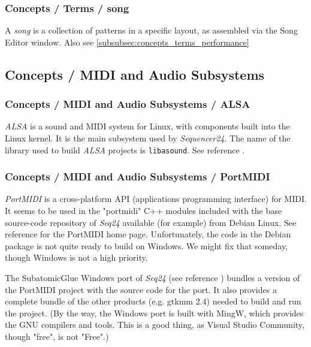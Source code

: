\subsubsection{Concepts / Terms / song}
\label{subsubsec:concepts_terms_song}

   A \textsl{song} is a collection of patterns in a specific layout, as
   assembled via the Song Editor window.
   Also see \ref{subsubsec:concepts_terms_performance}

\subsection{Concepts / MIDI and Audio Subsystems}
\label{subsec:concepts_midi_audio_subsystems}

\subsubsection{Concepts / MIDI and Audio Subsystems / ALSA}
\label{subsubsec:concepts_midi_audio_alsa}

   \textsl{ALSA} is a sound and MIDI system for Linux, with components built
   into the Linux kernel. It is the main subsystem used by
   \textsl{Sequencer24}.  The name of the library used to build
   \textsl{ALSA} projects is \texttt{libasound}.
   See reference \cite{alsa}.

\subsubsection{Concepts / MIDI and Audio Subsystems / PortMIDI}
\label{subsubsec:concepts_midi_audio_portmidi}

   \textsl{PortMIDI} is a cross-platform API (applications programming
   interface) for MIDI.  It seems to be used in the "portmidi" C++ modules
   included with the base source-code repository of \textsl{Seq24} available
   (for example) from Debian Linux.  See reference \cite{portmidi}
   for the PortMIDI home page.  Unfortunately, the code in the Debian
   package is not quite ready to build on Windows.  We might fix that
   someday, though Windows is not a high priority.

   The SubatomicGlue Windows port of \textsl{Seq24} (see reference
   \cite{subatomicglue}) bundles a version of the PortMIDI project with the
   source code for the port.  It also provides a complete bundle of the
   other products (e.g. gtkmm 2.4) needed to build and run the project.
   (By the way, the Windows port is built with
   MingW, which provides the GNU compilers and tools.  This is a good thing,
   as Visual Studio Community, though "free", is not "Free".)

